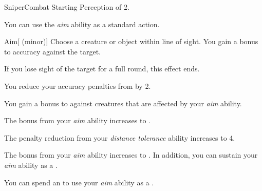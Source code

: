     \begin{feat}{Sniper}{Combat}
        \featpre Starting Perception of 2.

         You can use the \textit{aim} ability as a standard action.
        \begin{freeability}{Aim}[ (minor)]
            Choose a creature or object within line of sight.
            You gain a  bonus to accuracy against the target.

            If you lose sight of the target for a full round, this effect ends.
        \end{freeability}

         You reduce your accuracy penalties from  by 2.

         You gain a  bonus to  against \unaware creatures that are affected by your \textit{aim} ability.

         The bonus from your \textit{aim} ability increases to .

         The penalty reduction from your \textit{distance tolerance} ability increases to 4.

         The bonus from your \textit{aim} ability increases to .
        In addition, you can sustain your \textit{aim} ability as a .

         You can spend an  to use your \textit{aim} ability as a .
    \end{feat}

